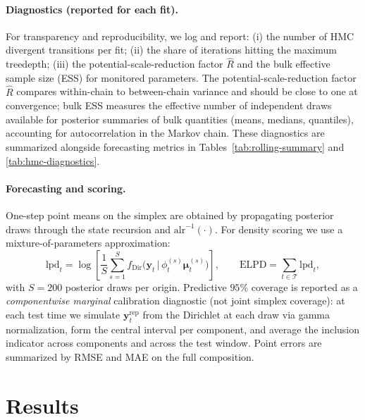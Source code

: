 \documentclass[12pt]{article}
\newcommand{\alrinv}{\mathrm{alr}^{-1}}
\newcommand{\lpd}{\mathrm{lpd}}
\theoremstyle{remark}
\newcommand{\Dir}{\mathrm{Dir}}
\newcommand{\elpd}{\mathrm{ELPD}}
\newcommand{\bfmu}{\boldsymbol{\mu}}
\newcommand{\bfy}{\mathbf{y}}
\begin{document}
\paragraph{Diagnostics (reported for each fit).}
For transparency and reproducibility, we log and report: (i) the number of HMC divergent transitions per fit; (ii) the share of iterations hitting the maximum treedepth; (iii) the potential-scale-reduction factor $\widehat{R}$ \citep{vehtari2021ranknormalization} and the bulk effective sample size (ESS) for monitored parameters. The potential-scale-reduction factor $\widehat{R}$ compares within-chain to between-chain variance and should be close to one at convergence; bulk ESS measures the effective number of independent draws available for posterior summaries of bulk quantities (means, medians, quantiles), accounting for autocorrelation in the Markov chain. These diagnostics are summarized alongside forecasting metrics in Tables~\ref{tab:rolling-summary} and \ref{tab:hmc-diagnostics}.

\paragraph{Forecasting and scoring.}
One-step point means on the simplex are obtained by propagating posterior draws through the state recursion and $\alrinv(\cdot)$. For density scoring we use a mixture-of-parameters approximation:
\[
\lpd_t = \log\!\left[\frac{1}{S}\sum_{s=1}^S f_{\Dir}\!\big(\bfy_t\,\big|\,\phi_t^{(s)}\bfmu_t^{(s)}\big)\right],\qquad \elpd=\sum_{t\in\mathcal{T}}\lpd_t,
\]
with $S=200$ posterior draws per origin. Predictive $95\%$ coverage is reported as a \emph{componentwise marginal} calibration diagnostic (not joint simplex coverage): at each test time we simulate $\bfy_t^{\text{rep}}$ from the Dirichlet at each draw via gamma normalization, form the central interval per component, and average the inclusion indicator across components and across the test window. Point errors are summarized by RMSE and MAE on the full composition.

\section{Results}\label{sec:results}
\end{document}
